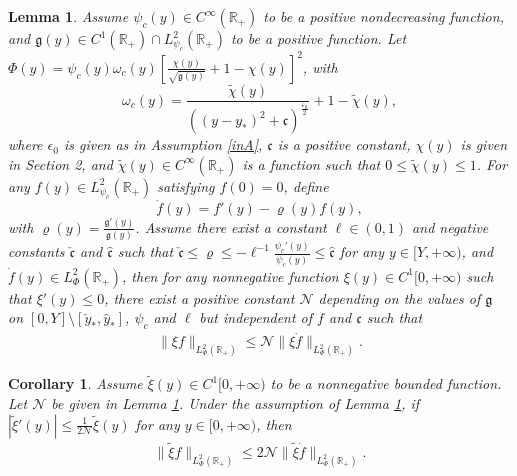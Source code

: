 \documentclass[10pt,a4paper]{amsart}
\newtheorem{lemma}{Lemma}
\newtheorem{corollary}{Corollary}
\begin{document}
\begin{lemma}\label{nc}
Assume $\psi_{c}(y)\in C^{\infty}(\mathbb{R}_{+})$ to be a positive nondecreasing function,
and $\mathfrak{g}(y)\in C^{1}(\mathbb{R}_{+})\cap L_{\psi_{c}}^{2}(\mathbb{R}_{+})$ to be a positive function.
Let $\Phi(y)=\psi_{c}(y)\omega_{c}(y)\left[\frac{\chi(y)}{\sqrt{\mathfrak{g}(y)}}+1-\chi(y)\right]^{2}$, with
$$\omega_{c}(y)=\frac{\tilde{\chi}(y)}{((y-y_{*})^{2}+\mathfrak{c})^{\frac{\varepsilon_{0}}{2}}}+1-\tilde{\chi}(y),$$
where $\epsilon_{0}$ is given as in Assumption \ref{inA}, $\mathfrak{c}$ is a positive constant, $\chi(y)$ is given in Section 2, and $\tilde{\chi}(y)\in C^{\infty}(\mathbb{R}_{+})$ is a function such that
$0\leq\tilde{\chi}(y)\leq 1$.
For any $f(y)\in L_{\psi_{c}}^{2}(\mathbb{R}_{+})$ satisfying $f(0)=0$, define $$\dot{f}(y)=f'(y)-\varrho(y)f(y),$$
with $\varrho(y)=\frac{\mathfrak{g}'(y)}{\mathfrak{g}(y)}$.
Assume there exist a constant $\ell\in(0,1)$ and negative constants $\check{\mathfrak{c}}$ and $\hat{\mathfrak{c}}$ such that
 $\check{\mathfrak{c}}\leq\varrho\leq -\ell^{-1}\frac{\psi_{c}'(y)}{\psi_{c}(y)}\leq\hat{\mathfrak{c}}$ for any $y\in[Y,+\infty)$,
and $\dot{f}(y)\in L_{\Phi}^{2}(\mathbb{R}_{+})$,
then for any nonnegative function $\xi(y)\in C^{1}[0,+\infty)$ such that $\xi'(y)\leq0$,
there exist a positive constant $\mathcal{N}$ depending on the values of $\mathfrak{g}$ on $[0,Y]\setminus[\check{y}_{*},\hat{y}_{*}]$, $\psi_{c}$ and $\ell$ but independent of $f$ and $\mathfrak{c}$ such that
\begin{align}\label{nce0}
\|\xi f\|_{L_{\Phi}^{2}(\mathbb{R}_{+})}\leq \mathcal{N}\|\xi\dot{f}\|_{L_{\Phi}^{2}(\mathbb{R}_{+})}.
\end{align}
\end{lemma}

\begin{corollary}\label{ncC1}
Assume $\tilde{\xi}(y)\in C^{1}[0,+\infty)$ to be a nonnegative bounded function. Let $\mathcal{N}$ be given in Lemma \ref{nc}.
Under the assumption of Lemma \ref{nc}, if $|\tilde{\xi}'(y)|\leq \frac{1}{2\mathcal{N}}\tilde{\xi}(y)$ for any $y\in[0,+\infty)$, then
\begin{align*}
\|\tilde{\xi} f\|_{L_{\Phi}^{2}(\mathbb{R}_{+})}\leq 2\mathcal{N}\|\tilde{\xi}\dot{f}\|_{L_{\Phi}^{2}(\mathbb{R}_{+})}.
\end{align*}

\end{corollary}
\end{document}
